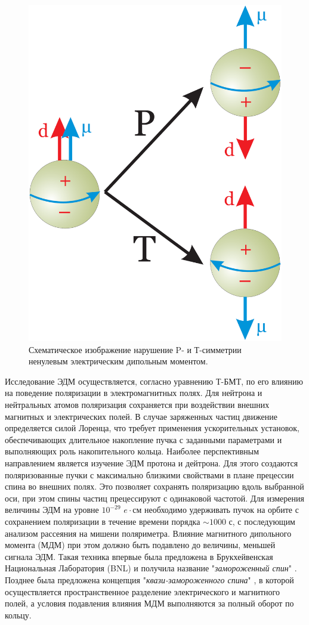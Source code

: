 \begin{figure}
	\centering
	\includegraphics[width=0.4\linewidth]{images/4_EDM_P_T}
	\caption{Схематическое изображение нарушение P- и Т-симметрии ненулевым электрическим дипольным моментом.}
	\label{fig:4edmpt}
\end{figure}

\par	Исследование ЭДМ осуществляется, согласно уравнению Т-БМТ, по его влиянию на поведение поляризации в электромагнитных полях. Для нейтрона и нейтральных атомов поляризация сохраняется при воздействии внешних магнитных и электрических полей. В случае заряженных частиц движение определяется силой Лоренца, что требует применения ускорительных установок, обеспечивающих длительное накопление пучка с заданными параметрами и выполняющих роль накопительного кольца. Наиболее перспективным направлением является изучение ЭДМ протона и дейтрона. Для этого создаются поляризованные пучки с максимально близкими свойствами в плане прецессии спина во внешних полях. Это позволяет сохранять поляризацию вдоль выбранной оси, при этом спины частиц прецессируют с одинаковой частотой. Для измерения величины ЭДМ на уровне $10^{-29}$ $e\cdot \text{см}$ необходимо удерживать пучок на орбите с сохранением поляризации в течение времени порядка $\sim1000$ с, с последующим анализом рассеяния на мишени поляриметра. Влияние магнитного дипольного момента (МДМ) при этом должно быть подавлено до величины, меньшей сигнала ЭДМ. Такая техника впервые была предложена в Брукхейвенская Национальная Лаборатория (BNL) и получила название "\textit{замороженный спин}" \autocite{Farley:edm}. Позднее была предложена концепция "\textit{квази-замороженного спина}" \autocite{QFS}, в которой осуществляется пространственное разделение электрического и магнитного полей, а условия подавления влияния МДМ выполняются за полный оборот по кольцу.

